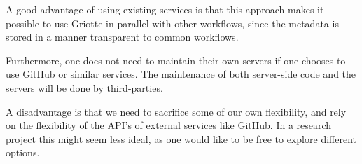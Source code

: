 \documentclass[conference,a4paper]{IEEEtran}
\begin{document}
A good advantage of using existing services is that this approach
makes it possible to use Griotte in parallel with other workflows,
since the metadata is stored in a manner transparent to common
workflows.

Furthermore, one does not need to maintain their own servers if one
chooses to use GitHub or similar services. The maintenance of both
server-side code and the servers will be done by third-parties.

A disadvantage is that we need to sacrifice some of our own
flexibility, and rely on the flexibility of the API's of external
services like GitHub. In a research project this might seem less
ideal, as one would like to be free to explore different
options.

\end{document}
